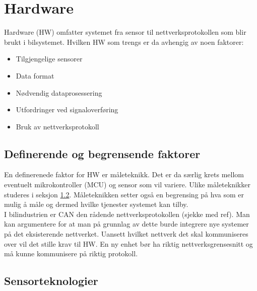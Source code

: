 \section{Hardware}

Hardware (HW) omfatter systemet fra sensor til nettverksprotokollen som blir brukt i
bilsystemet. Hvilken HW
som trengs er da avhengig av noen faktorer:
\begin{itemize}
\item Tilgjengelige sensorer
\item Data format
\item Nødvendig dataprosessering
\item Utfordringer ved signaloverføring
\item Bruk av nettverksprotokoll
\end{itemize}


\subsection{Definerende og begrensende faktorer}

En definerenede faktor for HW er måleteknikk. Det er da særlig krets
mellom eventuelt mikrokontroller (MCU) og sensor som vil variere. Ulike måleteknikker studeres
i seksjon \ref{subsec:sensorteknologier}. Måleteknikken setter også en begrensing på hva som er
mulig å måle og dermed hvilke tjenester systemet kan tilby. \\

I bilindustrien er CAN den rådende nettverksprotokollen (sjekke med ref). Man
kan argumentere for at man på grunnlag av dette burde integrere nye systemer på
det eksisterende nettverket. Uansett hvilket nettverk det skal kommuniseres over
vil det stille krav til HW. En ny enhet bør ha riktig nettverksgrensesnitt
og må kunne kommunisere på riktig protokoll. \\

\subsection{Sensorteknologier}
\label{subsec:sensorteknologier}



